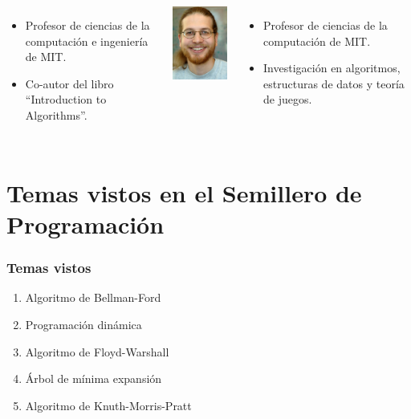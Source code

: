 \documentclass{beamer}
\begin{document}
\begin{frame}
\begin{columns}[l]
				\begin{itemize}
					\item Profesor de ciencias de la computación e ingeniería de MIT.
					\item Co-autor del libro ``Introduction to Algorithms''.
				\end{itemize}
				\begin{center} \includegraphics[height = 0.25\textheight]{Demaine.jpg} \end{center}
				\begin{itemize}
					\item Profesor de ciencias de la computación de MIT.
					\item Investigación en algoritmos, estructuras de datos y teoría de juegos.
				\end{itemize}
		\end{columns}
	\end{frame}
	
\section[Temas vistos]{Temas vistos en el Semillero de Programación}
	\begin{frame}
		\frametitle{Temas vistos}
		\begin{enumerate}
			\item{Algoritmo de Bellman-Ford}
			\item{Programación dinámica}
			\item{Algoritmo de Floyd-Warshall}
			\item{Árbol de mínima expansión}
			\item{Algoritmo de Knuth-Morris-Pratt}
		\end{enumerate}
	\end{frame}
	
\end{document}
